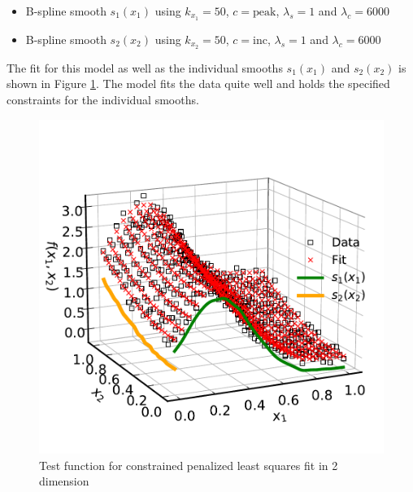 \documentclass[10pt,a4paper]{article}
\begin{document}
	\begin{itemize}
		\item B-spline smooth $s_1(x_1)$ using $k_{x_1} = 50$, $c = \text{peak}$, $\lambda_s = 1$ and $\lambda_c = 6000$
		\item B-spline smooth $s_2(x_2)$ using $k_{x_2} = 50$, $c = \text{inc}$, $\lambda_s = 1$ and $\lambda_c = 6000$
	\end{itemize}
		
	The fit for this model as well as the individual smooths $s_1(x_1)$ and $s_2(x_2)$ is shown in Figure \ref{fig:2d_example}. The model fits the data quite well and holds the specified constraints for the individual smooths.
		
	\begin{figure}[H]
	\centering
	\includegraphics[width=\linewidth]{thesisplots/2d_example.pdf}
	\caption{Test function for constrained penalized least squares fit in 2 dimension}
	\label{fig:2d_example}
	\end{figure}


	
\printbibliography
	
\end{document}
